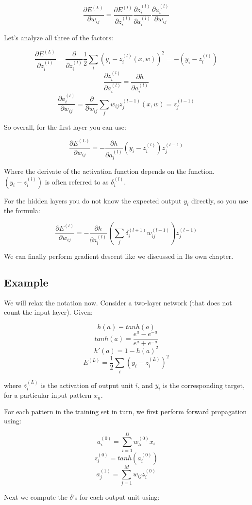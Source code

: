 \documentclass[11pt]{article}
\begin{document}
\[\frac{\partial E^{(L)}}{\partial w_{ij}}=\frac{\partial E^{(l)}}{\partial z_i^{(l)}}\frac{\partial z_i^{(l)}}{\partial a_i^{(l)}}\frac{\partial a_i^{(l)}}{\partial w_{ij}}\]

Let's analyze all three of the factors:

\[\frac{\partial E^{(L)}}{\partial z_i^{(l)}}=\frac{\partial}{\partial z_i^{(l)}}\frac{1}{2}\sum_i (y_i-z_i^{(l)}(x, w))^2=-(y_i-z_i^{(l)})\]
\[\frac{\partial z_i^{(l)}}{\partial a_i^{(l)}}=\frac{\partial h}{\partial a_i^{(l)}}\]
\[\frac{\partial a_i^{(l)}}{\partial w_{ij}}=\frac{\partial}{\partial w_{ij}}\sum_j w_{ij}z_j^{(l-1)}(x, w)=z_j^{(l-1)}\]

So overall, for the first layer you can use:

\[\frac{\partial E^{(L)}}{\partial w_{ij}}=-\frac{\partial h}{\partial a_i^{(l)}}(y_i-z_i^{(l)})z_j^{(l-1)}\]

Where the derivate of the activation function depends on the function.
\((y_i-z_i^{(l)})\) is often referred to as \(\delta_i^{(l)}\).

For the hidden layers you do not know the expected output \(y_i\)
directly, so you use the formula:

\[\frac{\partial E^{(l)}}{\partial w_{ij}}=-\frac{\partial h}{\partial a_i^{(l)}}(\sum_j\delta^{(l+1)}_iw_{ij}^{(l+1)}) z_j^{(l-1)}\]

We can finally perform gradient descent like we discussed in Its own
chapter.

\subsection{Example}\label{example}

We will relax the notation now. Consider a two-layer network (that does
not count the input layer). Given:

\[h(a)\equiv tanh(a)\] \[tanh(a)=\frac{e^a-e^{-a}}{e^a+e^{-a}}\]
\[h'(a)=1-h(a)^2\] \[E^{(L)} = \frac{1}{2}\sum_{i} (y_i - z_i^{(L)})^2\]

where \(z_i^{(L)}\) is the activation of output unit \(i\), and \(y_i\)
is the corresponding target, for a particular input pattern \(x_n\).

For each pattern in the training set in turn, we first perform forward
propagation using:

\[a_i^{(0)} = \sum_{i=1}^D w_{li}^{(0)}x_i\]
\[z_i^{(0)} = tanh(a_i^{(0)})\]
\[a_j^{(1)} = \sum_{j=1}^M w_{ij}z_i^{(0)}\]

Next we compute the \(\delta\)'s for each output unit using:
\end{document}
